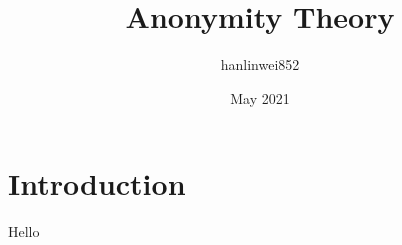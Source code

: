 \documentclass{article}
\title{Anonymity Theory}
\author{hanlinwei852 }
\date{May 2021}
\begin{document}
\maketitle

\section{Introduction}
Hello
\end{document}
